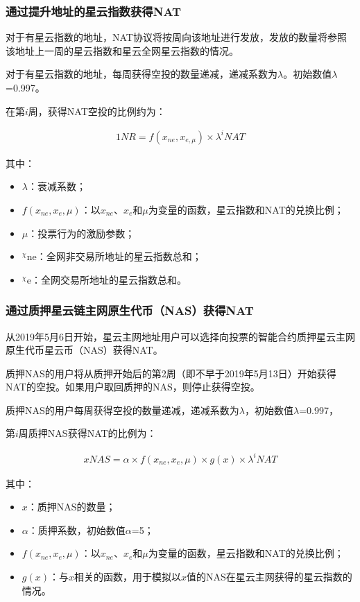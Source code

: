 \subsubsection{通过提升地址的星云指数获得NAT}

对于有星云指数的地址，NAT协议将按周向该地址进行发放，发放的数量将参照该地址上一周的星云指数和星云全网星云指数的情况。

对于有星云指数的地址，每周获得空投的数量递减，递减系数为$\lambda$。初始数值$\lambda$=0.997。

在第$i$周，获得NAT空投的比例约为：

\begin{align}
1 NR=f(x_{ne},x_{e,\mu })\times\lambda^{i} NAT
\end{align} 

其中：
\begin{itemize}
	\item $\lambda$：衰减系数；
	\item $f(x_{ne},x_{e},\mu)$：以$x_{ne}$、$x_{e}$和$\mu$为变量的函数，星云指数和NAT的兑换比例；
	\item $\mu$：投票行为的激励参数；
	\item $_{}^{\chi}\textrm{ne}$：全网非交易所地址的星云指数总和；
	\item $_{}^{\chi}\textrm{e}$：全网交易所地址的星云指数总和。
\end{itemize}

\subsubsection{通过质押星云链主网原生代币（NAS）获得NAT}

从2019年5月6日开始，星云主网地址用户可以选择向投票的智能合约质押星云主网原生代币星云币（NAS）获得NAT。

质押NAS的用户将从质押开始后的第2周（即不早于2019年5月13日）开始获得NAT的空投。如果用户取回质押的NAS，则停止获得空投。

质押NAS的用户每周获得空投的数量递减，递减系数为$\lambda$，初始数值$\lambda$=0.997，

第$i$周质押NAS获得NAT的比例为： 

\begin{align}
x NAS = \alpha \times f(x_{ne},x_{e},\mu)\times g(x) \times \lambda^{i} NAT
\end{align}

其中：

\begin{itemize}
	\item $x$：质押NAS的数量；
	\item $\alpha$：质押系数，初始数值$\alpha$=5；
	\item $f(x_{ne},x_{e},\mu)$：以$x_{ne}$、$x_{e}$和$\mu$为变量的函数，星云指数和NAT的兑换比例；
	\item $g(x)$：与$x$相关的函数，用于模拟以$x$值的NAS在星云主网获得的星云指数的情况。
\end{itemize}



